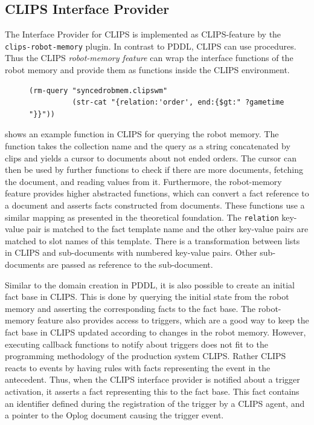 \subsection{CLIPS Interface Provider}
\label{sec:impl-clips}
The Interface Provider for CLIPS is implemented as CLIPS-feature by
the \texttt{clips-robot-memory} plugin.  In contrast to PDDL, CLIPS can use procedures. Thus
the CLIPS \emph{robot-memory feature} can wrap the interface functions
of the robot memory and provide them as functions inside the CLIPS
environment.
\begin{figure}
  \begin{lstlisting}[showlines,style=ReallySmallCLIPS, caption={CLIPS function to execute a query},
  label=lst:clips-rm,
  emph={skill, args, state, target, res},
  emphstyle=\bfseries\color{green!80!black},
  emph={[2]\?skill, \$\?args, wait-for-lock, \?target, use,
  WAIT-FOR-LOCK, SKILL-EXECUTION, running},
  emphstyle={[2]\bfseries\color{blue!80!black}},
  morekeywords={retract, assert, modify, skill-call, skill-to-execute,
    wait-for-lock}]
(rm-query "syncedrobmem.clipswm"
          (str-cat "{relation:'order', end:{$gt:" ?gametime "}}"))
\end{lstlisting} %
\end{figure}
 shows an example function in CLIPS for querying
the robot memory. The function takes the collection name and the query
as a string concatenated by clips and yields a cursor to documents
about not ended orders. The cursor can then be used by further
functions to check if there are more documents, fetching the document,
and reading values from it. Furthermore, the robot-memory feature
provides higher abstracted functions, which can convert a fact
reference to a document and asserts facts constructed from
documents. These functions use a similar mapping as presented in the
theoretical foundation. The \texttt{relation} key-value pair is
matched to the fact template name and the other key-value pairs are
matched to slot names of this template. There is a transformation
between lists in CLIPS and sub-documents with numbered key-value
pairs. Other sub-documents are passed as reference to the
sub-document. 

Similar to the domain creation in PDDL, it is also possible to create
an initial fact base in CLIPS. This is done by querying the initial
state from the robot memory and asserting the corresponding facts to
the fact base. The robot-memory feature also provides access to
triggers, which are a good way to keep the fact base in CLIPS updated
according to changes in the robot memory. However, executing callback
functions to notify about triggers does not fit to the programming
methodology of the production system CLIPS. Rather CLIPS reacts to
events by having rules with facts representing the event in the
antecedent. Thus, when the CLIPS interface provider is notified about
a trigger activation, it asserts a fact representing this to the fact
base. This fact contains an identifier defined during the registration
of the trigger by a CLIPS agent, and a pointer to the Oplog document
causing the trigger event.

